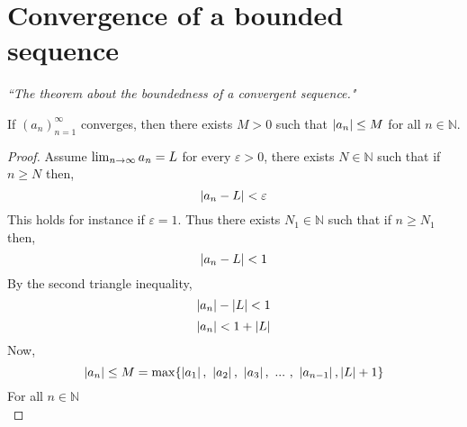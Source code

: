 \documentclass[12pt]{report}
\begin{document}
    \section{Convergence of a bounded sequence}
    \label{Convergence of a bounded sequence}
    \textit{``The theorem about the boundedness of a convergent sequence."} \vspace{3mm}
    \begin{theorem}
        If \(\left(a_n\right)^\infty _{n=1}\) converges, then there exists \(M > 0\) such that \(\left| a_n \right| \leq M\) for all \(n \in \mathbb{N}\).
    \end{theorem}
    \begin{proof}
        Assume \(\lim_{n \to \infty} a_n = L\) for every \(\varepsilon > 0\), there exists \(N \in \mathbb{N}\) such that if \(n \geq N\) then,
        \[\left| a_n - L \right| < \varepsilon\]
        This holds for instance if \(\varepsilon = 1\). Thus there exists \(N_1 \in \mathbb{N}\) such that if \(n \geq N_1\) then,
        \[\left| a_n - L  \right| < 1\]
        By the second triangle inequality,
        \[\left| a_n \right| - \left| L \right| < 1\]
        \[\left| a_n \right| < 1+ \left| L \right|\]
        Now, 
        \[\left| a_n \right| \leq M = \max \{\left| a_1 \right|,~ \left| a_2 \right|,~ \left| a_3 \right|, ~ ... ~,~ \left| a_{n-1} \right|, \left| L \right| + 1  \}\]
        For all \(n \in \mathbb{N}\)\\
    \end{proof}    
\end{document}
